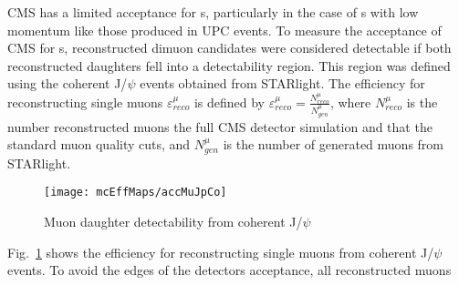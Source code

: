        CMS has a limited acceptance for \DIFdelbegin {}\DIFdelend \DIFaddbegin {}\DIFaddend s, particularly in the case of 
        \DIFdelbegin {}\DIFdelend \DIFaddbegin {}\DIFaddend s with low momentum like those produced in UPC events. 
      To measure the acceptance of CMS for \DIFdelbegin {}\DIFdelend \DIFaddbegin {}\DIFaddend s, reconstructed dimuon 
        candidates were considered detectable if both reconstructed daughters 
        fell into a detectability region.
      This region was defined using the coherent J/$\psi$ events obtained from 
        STARlight.
      The efficiency for reconstructing single muons $\varepsilon^{\mu}_{reco}$ 
        is defined by $\varepsilon^{\mu}_{reco} = \frac{N^{\mu}_{reco}}{N^{\mu}_{gen}}$, 
        where $N^{\mu}_{reco}$ is the number reconstructed muons \DIFdelbegin {}\DIFdelend \DIFaddbegin {}\DIFaddend the full CMS detector simulation and that \DIFdelbegin {}\DIFdelend \DIFaddbegin {}\DIFaddend the standard
        muon quality cuts, and $N^{\mu}_{gen}$ is the number of generated 
        muons from STARlight.
      \DIFdelbegin %
\DIFdelend \DIFaddbegin \begin{figure}[!Hhtb]
        \DIFaddendFL \centering
          \texttt{[image: mcEffMaps/accMuJpCo]} 
        \caption{ Muon daughter detectability from coherent J/$\psi$\DIFdelbeginFL {}\DIFdelendFL }
        \label{fig:muonDaughterDet}
      \DIFdelbeginFL %
\DIFdelendFL \DIFaddbeginFL \end{figure}
      \DIFaddend Fig.~\ref{fig:muonDaughterDet} shows the efficiency for reconstructing
        single muons from coherent J/$\psi$ events.
      To avoid the edges of the detectors acceptance, all reconstructed muons 
